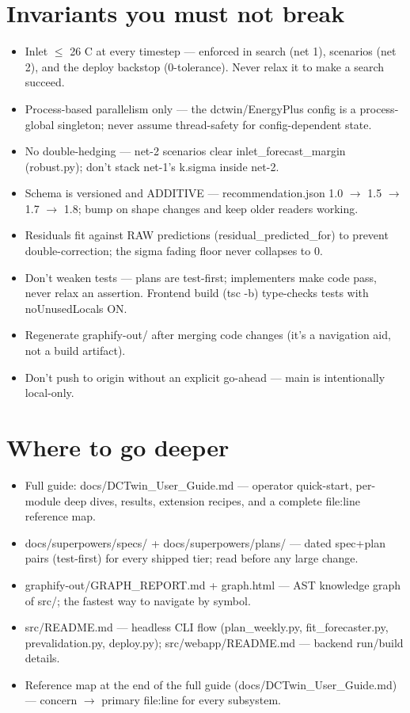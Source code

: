 \documentclass[10pt]{article}
\begin{document}
\section*{Invariants you must not break}
\begin{itemize}
\item Inlet $\leq$ 26 C at every timestep — enforced in search (net 1), scenarios (net 2), and the deploy backstop (0-tolerance). Never relax it to make a search succeed.
\item Process-based parallelism only — the dctwin/\allowbreak{}EnergyPlus config is a process-global singleton; never assume thread-safety for config-dependent state.
\item No double-hedging — net-2 scenarios clear inlet\_\allowbreak{}forecast\_\allowbreak{}margin (robust.py); don't stack net-1's k.sigma inside net-2.
\item Schema is versioned and ADDITIVE — recommendation.json 1.0 $\rightarrow$ 1.5 $\rightarrow$ 1.7 $\rightarrow$ 1.8; bump on shape changes and keep older readers working.
\item Residuals fit against RAW predictions (residual\_\allowbreak{}predicted\_\allowbreak{}for) to prevent double-correction; the sigma fading floor never collapses to 0.
\item Don't weaken tests — plans are test-first; implementers make code pass, never relax an assertion. Frontend build (tsc -b) type-checks tests with noUnusedLocals ON.
\item Regenerate graphify-out/\allowbreak{} after merging code changes (it's a navigation aid, not a build artifact).
\item Don't push to origin without an explicit go-ahead — main is intentionally local-only.
\end{itemize}

\section*{Where to go deeper}
\begin{itemize}
\item Full guide: docs/\allowbreak{}DCTwin\_\allowbreak{}User\_\allowbreak{}Guide.md — operator quick-start, per-module deep dives, results, extension recipes, and a complete file:line reference map.
\item docs/\allowbreak{}superpowers/\allowbreak{}specs/\allowbreak{} + docs/\allowbreak{}superpowers/\allowbreak{}plans/\allowbreak{} — dated spec+plan pairs (test-first) for every shipped tier; read before any large change.
\item graphify-out/\allowbreak{}GRAPH\_\allowbreak{}REPORT.md + graph.html — AST knowledge graph of src/\allowbreak{}; the fastest way to navigate by symbol.
\item src/\allowbreak{}README.md — headless CLI flow (plan\_\allowbreak{}weekly.py, fit\_\allowbreak{}forecaster.py, prevalidation.py, deploy.py); src/\allowbreak{}webapp/\allowbreak{}README.md — backend run/\allowbreak{}build details.
\item Reference map at the end of the full guide (docs/\allowbreak{}DCTwin\_\allowbreak{}User\_\allowbreak{}Guide.md) — concern $\rightarrow$ primary file:line for every subsystem.
\end{itemize}
\end{document}
